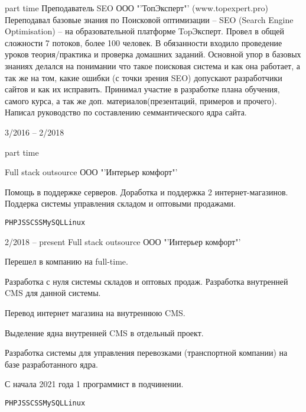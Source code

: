 \documentclass[10pt]{tpl/developercv} %
\begin{document}
\begin{entrylist}
{		\footnotesize{part time}}
		{Преподаватель SEO}
		{ООО "'ТопЭксперт"' (www.topexpert.pro)}
		{Переподавал базовые знания по Поисковой оптимизации -- SEO (Search Engine Optimisation) -- на образовательной платформе TopЭксперт. Провел в общей сложности 7 потоков, более 100 человек. В обязанности входило проведение уроков теория/практика и проверка домашних заданий. Основной упор в базовых знаниях делался на понимании что такое поисковая система и как она работает, а так же на том, какие ошибки (с точки зрения SEO) допускают разработчики сайтов и как их исправить. Принимал участие в разработке плана обучения, самого курса, а так же доп. материалов(презентаций, примеров и прочего). Написал руководство по составлению семмантического ядра сайта.}
	\entry
		{3/2016 -- 2/2018

		\footnotesize{part time}}
		{Full stack outsource}
		{ООО "'Интерьер комфорт"' }
		{Помощь в поддержке серверов. Доработка и поддержка 2 интернет-магазинов. Поддерка системы управления складом и оптовыми продажами.

		\texttt{PHP}\slashsep\texttt{JS}\slashsep\texttt{SCSS}\slashsep\texttt{MySQL}\slashsep\texttt{Linux}}
	\entry
		{2/2018 -- present}
		{Full stack outsource}
		{ООО "'Интерьер комфорт"' }
		{
    Перешел в компанию на full-time.

    Разработка с нуля системы складов и оптовых продаж. Разработка внутренней CMS для данной системы.

		Перевод интернет магазина на внутреннюю CMS.

		Выделение ядна внутренней CMS в отдельный проект.

		Разработка системы для управления перевозками (транспортной компании) на базе разработанного ядра.

		С начала 2021 года 1 программист в подчинении.

		\texttt{PHP}\slashsep\texttt{JS}\slashsep\texttt{SCSS}\slashsep\texttt{MySQL}\slashsep\texttt{Linux}}
\end{entrylist}


\end{document}
